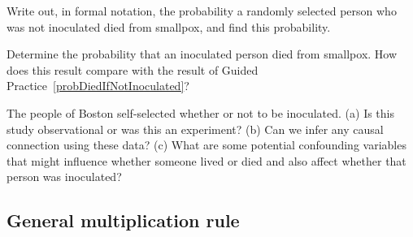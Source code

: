 \begin{exercisewrap}
\begin{nexercise} \label{probDiedIfNotInoculated}
Write out, in formal notation, the probability a randomly selected person who was not inoculated died from smallpox, and find this \mbox{probability.}\footnotemark\end{nexercise}
\end{exercisewrap}

\begin{exercisewrap}
\begin{nexercise}
Determine the probability that an inoculated person died from smallpox. How does this result compare with the result of Guided Practice~\ref{probDiedIfNotInoculated}?\footnotemark
\end{nexercise}
\end{exercisewrap}

\begin{exercisewrap}
\begin{nexercise}\label{SmallpoxInoculationObsExpExercise}
The people of Boston self-selected whether or not to be inoculated. (a) Is this study observational or was this an experiment? (b) Can we infer any causal connection using these data? (c) What are some potential confounding variables that might influence whether someone lived or died and also affect whether that person was inoculated?\footnotemark
\end{nexercise}
\end{exercisewrap}


\D{\newpage}

\subsection{General multiplication rule}

